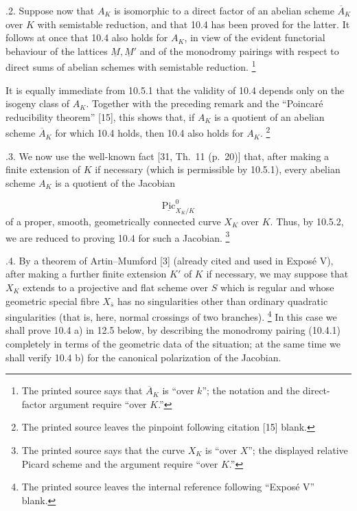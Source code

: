 \smallskip
{}.2. Suppose now that $A_K$ is isomorphic to a direct factor of an
abelian scheme $\overline A_K$ over $K$ with semistable reduction, and
that 10.4 has been proved for the latter. It follows at once that 10.4
also holds for $A_K$, in view of the evident functorial behaviour of the
lattices $\underline M,\underline M'$ and of the monodromy pairings with
respect to direct sums of abelian schemes with semistable reduction.
\footnote{The printed source says that $\overline A_K$ is ``over $k$'';
the notation and the direct-factor argument require ``over $K$.''}

It is equally immediate from 10.5.1 that the validity of 10.4 depends
only on the isogeny class of $A_K$. Together with the preceding remark
and the ``Poincar\'e reducibility theorem'' [15], this shows that, if
$A_K$ is a quotient of an abelian scheme $\overline A_K$ for which 10.4
holds, then 10.4 also holds for $A_K$.
\footnote{The printed source leaves the pinpoint following citation [15]
blank.}

\smallskip
{}.3. We now use the well-known fact [31, Th.~11 (p.~20)] that, after
making a finite extension of $K$ if necessary (which is permissible by
10.5.1), every abelian scheme $A_K$ is a quotient of the Jacobian

\begin{equation*}
\underline{\operatorname{Pic}}^0_{X_K/K}
\end{equation*}
of a proper, smooth, geometrically connected curve $X_K$ over $K$.
Thus, by 10.5.2, we are reduced to proving 10.4 for such a Jacobian.
\footnote{The printed source says that the curve $X_K$ is ``over $X$'';
the displayed relative Picard scheme and the argument require ``over
$K$.''}

\smallskip
{}.4. By a theorem of Artin--Mumford [3] (already cited and used in
Expos\'e V), after making a further finite extension $K'$ of $K$ if
necessary, we may suppose that $X_K$ extends to a projective and flat
scheme over $S$ which is regular and whose geometric special fibre
$X_{\bar s}$ has no singularities other than ordinary quadratic
singularities (that is, here, normal crossings of two branches).
\footnote{The printed source leaves the internal reference following
``Expos\'e V'' blank.}
In this case we shall prove 10.4 a) in 12.5 below, by describing the
monodromy pairing (10.4.1) completely in terms of the geometric data of
the situation; at the same time we shall verify 10.4 b) for the canonical
polarization of the Jacobian.

